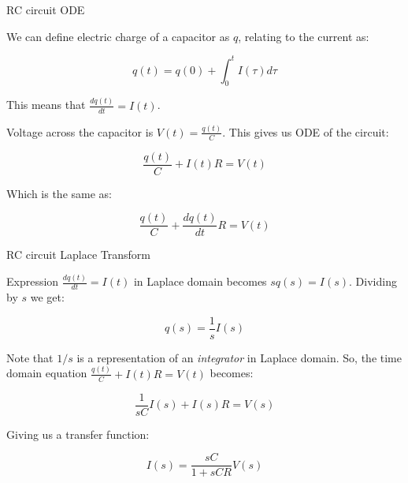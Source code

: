 \documentclass{beamer}
\begin{document}
\begin{frame}{RC circuit ODE}
	\begin{flushleft}
		
		We can define electric charge of a capacitor as $q$, relating to the current as:
		
		\begin{equation}
			q(t) = q(0) + \int_0^{t} I(\tau) d\tau
		\end{equation}
		
		This means that $\frac{dq(t)}{dt} = I(t)$.
		
		\bigskip
		
		Voltage across the capacitor is $V(t) = \frac{q(t)}{C}$. This gives us ODE of the circuit:
		
		\begin{equation}
			\frac{q(t)}{C} + I(t)R = V(t)
		\end{equation}
		
		Which is the same as:
		
		\begin{equation}
			\frac{q(t)}{C} + \frac{dq(t)}{dt} R = V(t)
		\end{equation}
		
		
	\end{flushleft}
\end{frame}



\begin{frame}{RC circuit Laplace Transform}
	\begin{flushleft}
		
		Expression $\frac{dq(t)}{dt} = I(t)$ in Laplace domain becomes $s q(s) = I(s)$. Dividing by $s$ we get:
		
		\begin{equation}
			q(s) = \frac{1}{s} I(s)
		\end{equation}
		
		Note that $1/s$ is a representation of an \emph{integrator} in Laplace domain. So, the time domain equation $\frac{q(t)}{C} + I(t)R = V(t)$ becomes:
		
		\begin{equation}
			\frac{1}{sC}I(s) + I(s)R = V(s)
		\end{equation}
		
		Giving us a transfer function:
		
		\begin{equation}
			I(s) =  \frac{sC}{1 + sCR}V(s)
		\end{equation}
		
		
	\end{flushleft}
\end{frame}
\end{document}

